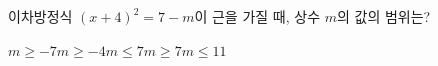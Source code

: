 이차방정식 $(x+4)^2=7-m$이 근을 가질 때, 상수 $m$의 값의 범위는?
\begin{choices32}{$m\ge -7$}{$m\ge -4$}{$m\le 7$}{$m\ge 7$}{$m\le 11$}\end{choices32}
